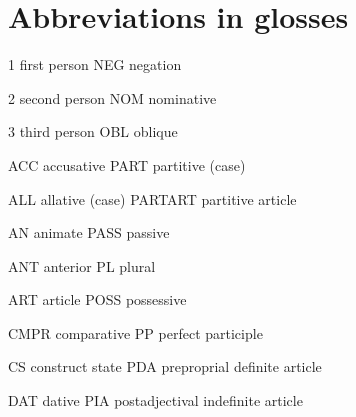 \section[Abbreviations in glosses]{Abbreviations in glosses\footnotemark{}}
1  first person  NEG  negation


2  second person  NOM  nominative


3  third person  OBL  oblique


ACC  accusative  PART  partitive (case)


ALL  allative (case)  PARTART  partitive article


AN  animate  PASS  passive


ANT  anterior  PL  plural


ART  article  POSS  possessive


CMPR  comparative  PP  perfect participle


CS  construct state  PDA  preproprial definite article


DAT  dative  PIA  postadjectival indefinite article


